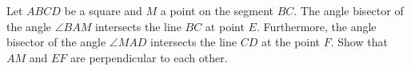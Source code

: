 Let $ABCD$ be a square and $M$ a point on the segment $BC$.
The angle bisector of the angle $\angle BAM$ intersects the line $BC$ at point $E$.
Furthermore, the angle bisector of the angle $\angle MAD$ intersects the line $CD$ at the point $F$.
Show that $AM$ and $EF$ are perpendicular to each other.